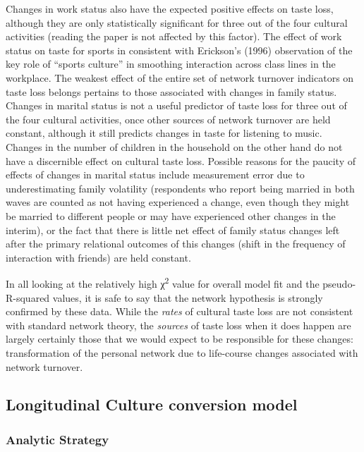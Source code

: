 Changes in work status also have the expected positive effects on taste loss, although they are only statistically significant for three out of the four cultural activities (reading the paper is not affected by this factor). The effect of work status on taste for sports in consistent with Erickson's (1996) observation of the key role of ``sports culture'' in smoothing interaction across class lines in the workplace. The weakest effect of the entire set of network turnover indicators on taste loss belongs pertains to those associated with changes in family status. Changes in marital status is not a useful predictor of taste loss for three out of the four cultural activities, once other sources of network turnover are held constant, although it still predicts changes in taste for listening to music. Changes in the number of children in the household on the other hand do not have a discernible effect on cultural taste loss. Possible reasons for the paucity of effects of changes in marital status include measurement error due to underestimating family volatility (respondents who report being married in both waves are counted as not having experienced a change, even though they might be married to different people or may have experienced other changes in the interim), or the fact that there is little net effect of family status changes left after the primary relational outcomes of this changes (shift in the frequency of interaction with friends) are held constant.

In all looking at the relatively high χ\textsuperscript{2} value for overall model fit and the pseudo-R-squared values, it is safe to say that the network hypothesis is strongly confirmed by these data. While the \emph{rates} of cultural taste loss are not consistent with standard network theory, the \emph{sources} of taste loss when it does happen are largely certainly those that we would expect to be responsible for these changes: transformation of the personal network due to life-course changes associated with network turnover.

\subsection{Longitudinal Culture conversion model}\label{longitudinal-culture-conversion-model}

\subsubsection{Analytic Strategy}\label{analytic-strategy-1}

